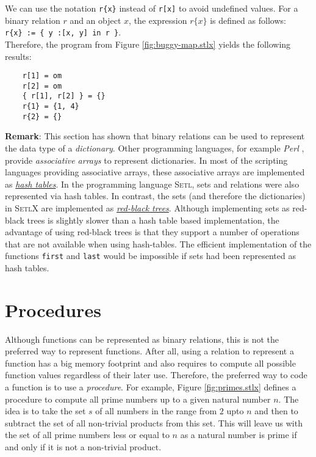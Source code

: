 We can use the notation  \texttt{r\{x\}} instead of \texttt{r[x]} to avoid undefined values.
For a binary relation $r$ and an object $x$, the expression $r\{x\}$ is defined as
follows: 
\\[0.2cm]
\hspace*{1.3cm} 
\texttt{r\{x\} := \{ y :[x, y] in r \}}.
\\[0.2cm]
Therefore, the  program from Figure \ref{fig:buggy-map.stlx} yields the following results:
\begin{verbatim}
    r[1] = om
    r[2] = om
    { r[1], r[2] } = {}
    r{1} = {1, 4}
    r{2} = {}
\end{verbatim}

\noindent
\textbf{Remark}:
This section has shown that binary relations can be used to represent the data type of a
\emph{dictionary}.  Other programming languages, for example \textsl{Perl} \cite{Wall92},
provide \emph{associative arrays} to represent dictionaries.  In most of the scripting languages
providing associative arrays, these associative arrays are implemented as 
\href{http://en.wikipedia.org/wiki/Hash_table}{\emph{hash tables}}.  In the programming language
\textsc{Setl}, sets and relations were also represented via hash tables.
In contrast, the sets (and therefore the dictionaries) in \textsc{SetlX} are implemented as 
\href{http://en.wikipedia.org/wiki/Red-black_tree}{\emph{red-black trees}}.
Although implementing sets as red-black trees is slightly slower than a hash table based
implementation, the advantage of using red-black trees is that they support a number of operations
that are not available when using hash-tables.  The efficient implementation of the functions \texttt{first}
and \texttt{last} would be impossible if sets had been represented as hash tables.


\section{Procedures}
Although functions can be represented as binary relations, this is not the preferred way
to represent functions.  After all, using a relation to represent a function
has a big memory footprint and also requires to compute all possible function
values regardless of their later use.  Therefore, the preferred way to code a function is
to use a \emph{procedure}.  For example, Figure \ref{fig:primes.stlx} defines a procedure
to compute all 
prime numbers up to a given natural number $n$.  The idea is to take the set $s$ of all numbers in
the range from $2$ upto $n$ and then to subtract the set of all non-trivial
products from this set.  This will leave us with the set of all prime numbers less or
equal to $n$ as a natural number is prime if and only if it is not a non-trivial product.

